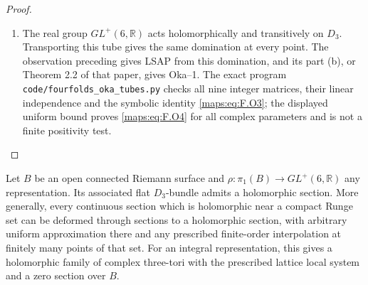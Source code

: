 \begin{proof}
\begin{enumerate}[label=\arabic*.]
\item The real group $GL^+(6,\mathbb R)$ acts holomorphically and
transitively on $D_3$.  Transporting this tube gives the same
domination at every point.  The observation preceding
\cite[Proposition 7.13 and preceding paragraph, pp.~23--24]{IVVOkaOneV5} gives LSAP from
this domination, and its part (b), or Theorem 2.2 of that paper,
gives Oka--1.  The exact program
\texttt{code/fourfolds\_oka\_tubes.py} checks all nine integer
matrices, their linear independence and the symbolic identity
\eqref{maps:eq:F.O3}; the displayed uniform bound proves \eqref{maps:eq:F.O4} for all complex
parameters and is not a finite positivity test.

\end{enumerate}
\end{proof}




\begin{theorem}\label{maps:src:F.3.9}


Let $B$ be an open connected Riemann surface and
$\rho:\pi_1(B)\to GL^+(6,\mathbb R)$ any representation.
Its associated flat $D_3$-bundle admits a holomorphic section.
More generally, every continuous section which is holomorphic
near a compact Runge set can be deformed through sections to a
holomorphic section, with arbitrary uniform approximation there
and any prescribed finite-order interpolation at finitely many
points of that set.  For an integral representation, this gives
a holomorphic family of complex three-tori with the prescribed
lattice local system and a zero section over $B$.

\end{theorem}


